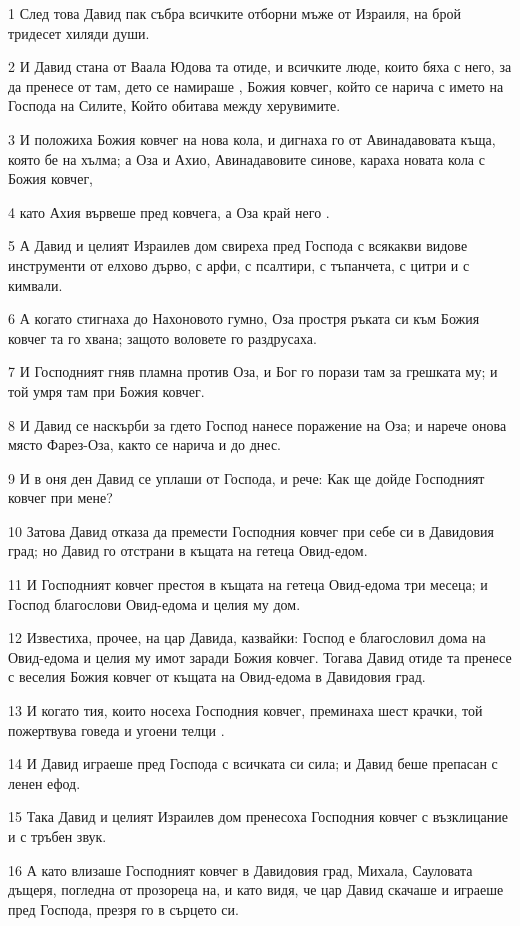 \par 1 След това Давид пак събра всичките отборни мъже от Израиля, на брой тридесет хиляди души.
\par 2 И Давид стана от Ваала Юдова та отиде, и всичките люде, които бяха с него, за да пренесе от там, дето се намираше , Божия ковчег, който се нарича с името на Господа на Силите, Който обитава между херувимите.
\par 3 И положиха Божия ковчег на нова кола, и дигнаха го от Авинадавовата къща, която бе на хълма; а Оза и Ахио, Авинадавовите синове, караха новата кола с Божия ковчег,
\par 4 като Ахия вървеше пред ковчега, а Оза край него .
\par 5 А Давид и целият Израилев дом свиреха пред Господа с всякакви видове инструменти от елхово дърво, с арфи, с псалтири, с тъпанчета, с цитри и с кимвали.
\par 6 А когато стигнаха до Нахоновото гумно, Оза простря ръката си към Божия ковчег та го хвана; защото воловете го раздрусаха.
\par 7 И Господният гняв пламна против Оза, и Бог го порази там за грешката му; и той умря там при Божия ковчег.
\par 8 И Давид се наскърби за гдето Господ нанесе поражение на Оза; и нарече онова място Фарез-Оза, както се нарича и до днес.
\par 9 И в оня ден Давид се уплаши от Господа, и рече: Как ще дойде Господният ковчег при мене?
\par 10 Затова Давид отказа да премести Господния ковчег при себе си в Давидовия град; но Давид го отстрани в къщата на гетеца Овид-едом.
\par 11 И Господният ковчег престоя в къщата на гетеца Овид-едома три месеца; и Господ благослови Овид-едома и целия му дом.
\par 12 Известиха, прочее, на цар Давида, казвайки: Господ е благословил дома на Овид-едома и целия му имот заради Божия ковчег. Тогава Давид отиде та пренесе с веселия Божия ковчег от къщата на Овид-едома в Давидовия град.
\par 13 И когато тия, които носеха Господния ковчег, преминаха шест крачки, той пожертвува говеда и угоени телци .
\par 14 И Давид играеше пред Господа с всичката си сила; и Давид беше препасан с ленен ефод.
\par 15 Така Давид и целият Израилев дом пренесоха Господния ковчег с възклицание и с тръбен звук.
\par 16 А като влизаше Господният ковчег в Давидовия град, Михала, Сауловата дъщеря, погледна от прозореца на, и като видя, че цар Давид скачаше и играеше пред Господа, презря го в сърцето си.
